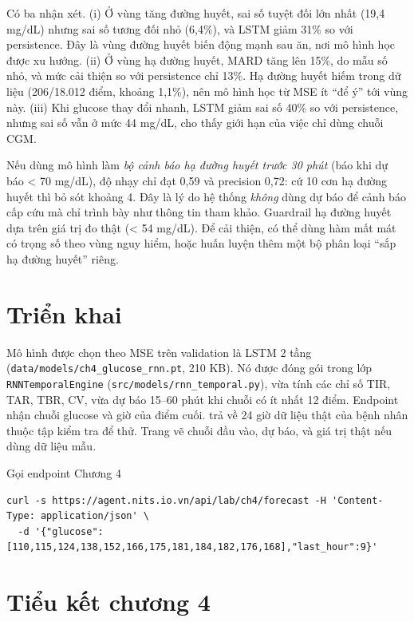Có ba nhận xét. (i) Ở vùng tăng đường huyết, sai số tuyệt đối lớn nhất (19,4 mg/dL) nhưng sai số tương đối nhỏ (6,4\%), và LSTM giảm 31\% so với persistence. Đây là vùng đường huyết biến động mạnh sau ăn, nơi mô hình học được xu hướng. (ii) Ở vùng hạ đường huyết, MARD tăng lên 15\%, do mẫu số nhỏ, và mức cải thiện so với persistence chỉ 13\%. Hạ đường huyết hiếm trong dữ liệu (206/18.012 điểm, khoảng 1,1\%), nên mô hình học từ MSE ít ``để ý'' tới vùng này. (iii) Khi glucose thay đổi nhanh, LSTM giảm sai số 40\% so với persistence, nhưng sai số vẫn ở mức 44 mg/dL, cho thấy giới hạn của việc chỉ dùng chuỗi CGM.

Nếu dùng mô hình làm \emph{bộ cảnh báo hạ đường huyết trước 30 phút} (báo khi dự báo < 70 mg/dL), độ nhạy chỉ đạt 0,59 và precision 0,72: cứ 10 cơn hạ đường huyết thì bỏ sót khoảng 4. Đây là lý do hệ thống \emph{không} dùng dự báo để cảnh báo cấp cứu mà chỉ trình bày như thông tin tham khảo. Guardrail hạ đường huyết dựa trên giá trị đo thật (< 54 mg/dL). Để cải thiện, có thể dùng hàm mất mát có trọng số theo vùng nguy hiểm, hoặc huấn luyện thêm một bộ phân loại ``sắp hạ đường huyết'' riêng.



\section{Triển khai}

Mô hình được chọn theo MSE trên validation là LSTM 2 tầng (\texttt{data/models/ch4\_glucose\_rnn.pt}, 210 KB). Nó được đóng gói trong lớp \texttt{RNNTemporalEngine} (\texttt{src/models/rnn\_temporal.py}), vừa tính các chỉ số TIR, TAR, TBR, CV, vừa dự báo 15–60 phút khi chuỗi có ít nhất 12 điểm. Endpoint  nhận chuỗi glucose và giờ của điểm cuối.  trả về 24 giờ dữ liệu thật của bệnh nhân thuộc tập kiểm tra để thử. Trang  vẽ chuỗi đầu vào, dự báo, và giá trị thật nếu dùng dữ liệu mẫu.

\begin{code}{Gọi endpoint Chương 4}
\label{lst:ch4-api}
\begin{verbatim}
curl -s https://agent.nits.io.vn/api/lab/ch4/forecast -H 'Content-Type: application/json' \
  -d '{"glucose":[110,115,124,138,152,166,175,181,184,182,176,168],"last_hour":9}'
\end{verbatim}
\end{code}

\section{Tiểu kết chương 4}

